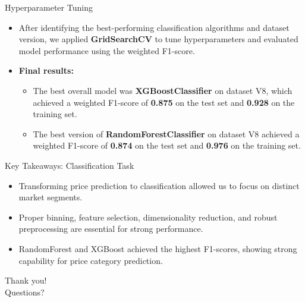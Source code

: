 \documentclass{beamer}
\begin{document}
\begin{frame}{Hyperparameter Tuning}
    \begin{itemize}
        \item After identifying the best-performing classification algorithms and dataset version, we applied \textbf{GridSearchCV} to tune hyperparameters and evaluated model performance using the weighted F1-score.
        \item \textbf{Final results:}
        \begin{itemize}
            \item The best overall model was \textbf{XGBoostClassifier} on dataset V8, which achieved a weighted F1-score of \textbf{0.875} on the test set and \textbf{0.928} on the training set.
            \item The best version of \textbf{RandomForestClassifier} on dataset V8 achieved a weighted F1-score of \textbf{0.874} on the test set and \textbf{0.976} on the training set.
        \end{itemize}
    \end{itemize}
\end{frame}



\begin{frame}{Key Takeaways: Classification Task}
        \begin{itemize}
                \item Transforming price prediction to classification allowed
                        us to focus on distinct market segments.
                \item Proper binning, feature selection, dimensionality
                        reduction, and robust preprocessing are essential for
                        strong performance.
                \item RandomForest and XGBoost achieved the highest F1-scores,
                        showing strong capability for price category
                        prediction.
        \end{itemize}
\end{frame}

\begin{frame}
        \centering
        \Huge
        Thank you! \\
        Questions?
\end{frame}
\end{document}
